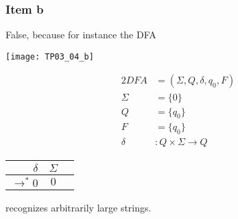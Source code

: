 {\subsubsection{Item b}
False, because for instance the DFA
\begin{center} \texttt{[image: TP03\_04\_b]} \end{center}
\begin{center}
\begin{minipage}[c]{0.25\textwidth}
	\begin{alignat*}{2}
		DFA    &= (\Sigma, Q, \delta, q_0, F)\\
		\Sigma &= \{0\}\\
		Q      &= \{q_0\}\\
		F      &= \{q_0\}\\
		\delta &\colon Q \times \Sigma \rightarrow Q
	\end{alignat*}
\end{minipage}%
\begin{minipage}[c]{0.2\textwidth}
	\begin{center}
	\begin{tabular}{ r | c c }
 		$\delta            $ & $\Sigma$ \\ \hline
 		$\rightarrow^* 0$ & $0     $ \\  
	\end{tabular}
	\end{center}
\end{minipage}
\end{center}
recognizes arbitrarily large strings.
\pagebreak
}
